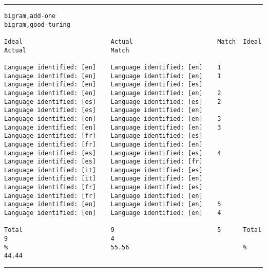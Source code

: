 \tiny
\hrule\vskip4pt
\begin{verbatim}
bigram,add-one                                                   bigram,good-turing

Ideal                        Actual                       Match  Ideal                        Actual                       Match

Language identified: [en]    Language identified: [en]    1      Language identified: [en]    Language identified: [en]    1
Language identified: [en]    Language identified: [es]           Language identified: [en]    Language identified: [en]    2
Language identified: [es]    Language identified: [es]    2      Language identified: [es]    Language identified: [en]
Language identified: [en]    Language identified: [en]    3      Language identified: [en]    Language identified: [en]    3
Language identified: [fr]    Language identified: [es]           Language identified: [fr]    Language identified: [en]
Language identified: [es]    Language identified: [es]    4      Language identified: [es]    Language identified: [fr]
Language identified: [it]    Language identified: [es]           Language identified: [it]    Language identified: [en]
Language identified: [fr]    Language identified: [es]           Language identified: [fr]    Language identified: [en]
Language identified: [en]    Language identified: [en]    5      Language identified: [en]    Language identified: [en]    4

Total                        9                            5      Total                        9                            4
%                            55.56                               %                            44.44
\end{verbatim}
\vskip4pt\hrule

